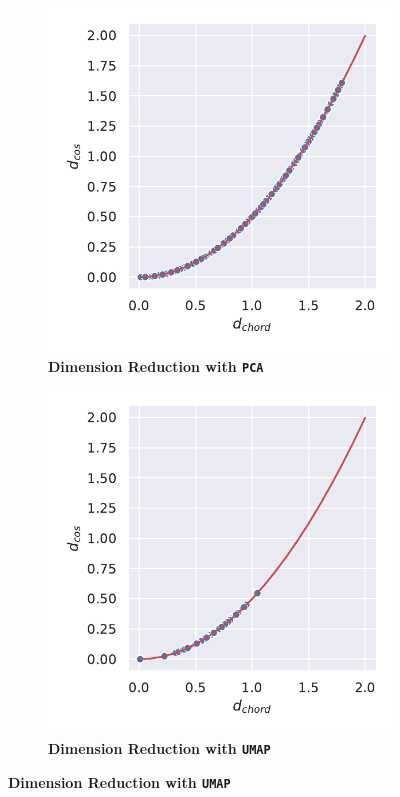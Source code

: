 \begin{figure}[!hbt]
    \centering
    \begin{subfigure}[b]{0.475\textwidth}
        \caption[Dimension Reduction with \texttt{PCA}]{\textbf{Dimension Reduction with \texttt{PCA}}}
        \label{subfig:Normalisation_PCA}            \includegraphics[width=\textwidth]{PCA/Difference_Distance_Calculation.pdf}
    \end{subfigure}
    \hfill
    \begin{subfigure}[b]{0.475\textwidth}
        \caption[Dimension Reduction with \texttt{UMAP}]{\textbf{Dimension Reduction with \texttt{UMAP}}}
        \label{subfig:Normalisation_UMAP}            \includegraphics[width=\textwidth]{UMAP/Difference_Distance_Calculation.pdf}

\end{subfigure}
\end{figure}
